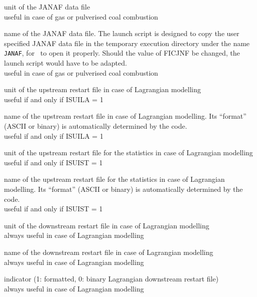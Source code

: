{unit of the JANAF data file\\ 
useful in case of gas or pulverised coal combustion}

{name of the JANAF data file. The launch script is designed to copy the
user specified JANAF data file in the temporary execution directory
under the name \texttt{JANAF}, for \CS\ to open it properly. Should the value
of FICJNF be changed, the launch script would have to be adapted.\\
useful in case of gas or pulverised coal combustion}


{unit of the upstream restart file in case of Lagrangian modelling\\ 
useful if and only if ISUILA = 1}

{name of the upstream restart file in case of Lagrangian modelling.
Its ``format'' (ASCII or
binary) is automatically determined by the code.\\
useful if and only if ISUILA = 1}

{unit of the upstream restart file for the statistics in case of
Lagrangian modelling\\ 
useful if and only if ISUIST = 1}

{name of the upstream restart file for the statistics in case of
Lagrangian modelling. Its ``format'' (ASCII or
binary) is automatically determined by the code.\\
useful if and only if ISUIST = 1}

{unit of the downstream restart file in case of Lagrangian modelling\\
always useful in case of Lagrangian modelling}

{name of the downstream restart file in case of Lagrangian modelling\\
always useful in case of Lagrangian modelling}

{indicator (1: formatted, 0: binary Lagrangian downstream restart file)\\
always useful in case of Lagrangian modelling}

